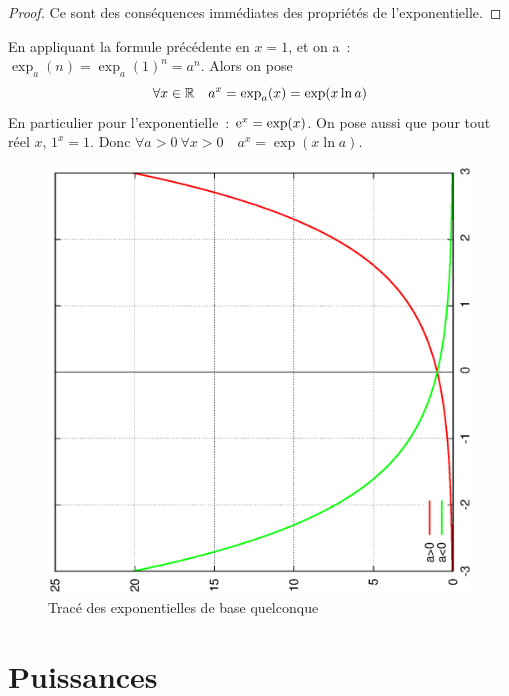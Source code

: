 \begin{proof}
  Ce sont des conséquences immédiates des propriétés de l'exponentielle.
\end{proof}
%
En appliquant la formule précédente en $x=1$, et on a~: $\exp_a(n)=\exp_a(1)^n=a^n$. Alors on pose
\begin{equation}
  \forall x \in \mathbb{R} \quad a^x=\exp_a(x)=\exp(x \ln a)
\end{equation}
En particulier pour l'exponentielle~: $\operatorname{e}^x=\exp(x)$. On pose aussi que pour tout réel $x$, $1^x=1$. Donc $\forall a>0 \ \forall x>0 \quad a^x=\exp(x \ln a)$.
%
\begin{figure}
  \centering
  \includegraphics[scale=0.4,angle=-90]{expa.ps}
  \caption{Tracé des exponentielles de base quelconque}
  \label{fig:traceexpa}
\end{figure}
%
\section{Puissances}
\label{sec:chap1-puissances}
